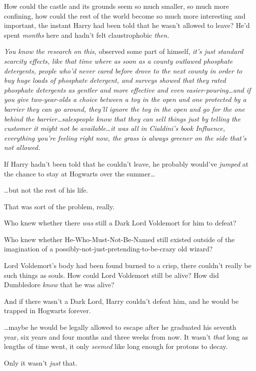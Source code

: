 How could the castle and its grounds seem so much smaller, so much more confining, how could the rest of the world become so much more interesting and important, the instant Harry had been told that he wasn’t allowed to leave? He’d spent \emph{months} here and hadn’t felt claustrophobic \emph{then.}

\emph{You \emph{know} the research on this,} observed some part of himself, \emph{it’s just standard scarcity effects, like that time where as soon as a county outlawed phosphate detergents, people who’d never cared before drove to the next county in order to buy huge loads of phosphate detergent, and surveys showed that they rated phosphate detergents as gentler and more effective and even easier-pouring…and if you give two-year-olds a choice between a toy in the open and one protected by a barrier they can go around, they’ll ignore the toy in the open and go for the one behind the barrier…salespeople know that they can sell things just by telling the customer it might not be available…it was all in Cialdini’s book \emph{Influence,} everything you’re feeling right now, the grass is always greener on the side that’s not allowed.}

If Harry hadn’t been told that he couldn’t leave, he probably would’ve \emph{jumped} at the chance to stay at Hogwarts over the summer…

…but not the rest of his life.

That was sort of the problem, really.

Who knew whether there \emph{was} still a Dark Lord Voldemort for him to defeat?

Who knew whether He-Who-Must-Not-Be-Named still existed outside of the imagination of a possibly-not-just-pretending-to-be-crazy old wizard?

Lord Voldemort’s body had been found burned to a crisp, there couldn’t really be such things as souls. How could Lord Voldemort still be alive? How did Dumbledore \emph{know} that he was alive?

And if there wasn’t a Dark Lord, Harry couldn’t defeat him, and he would be trapped in Hogwarts forever.

…maybe he would be legally allowed to escape after he graduated his seventh year, six years and four months and three weeks from now. It wasn’t \emph{that} long as lengths of time went, it only \emph{seemed} like long enough for protons to decay.

Only it wasn’t \emph{just} that.

